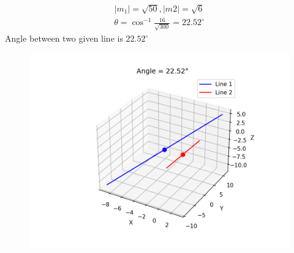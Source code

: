 \documentclass{beamer}
\theoremstyle{remark}
\numberwithin{equation}{section}
\begin{document}
\begin{frame}
\begin{align}
    |m_1|=\sqrt{50}, |m2|=\sqrt{6}
\end{align}
\begin{align}
    \theta=\cos^{-1}{\frac{16}{\sqrt{300}}}=22.52^{\circ}
    \end{align}
Angle between two given line is $22.52^{\circ}$
\end{frame}
\begin{frame}
\begin{figure}[h]
    \centering
    \includegraphics[width=1.0\linewidth]{figures/lines3d.png}
    \caption{}
    \label{}
\end{figure}

\end{frame}
\end{document}
